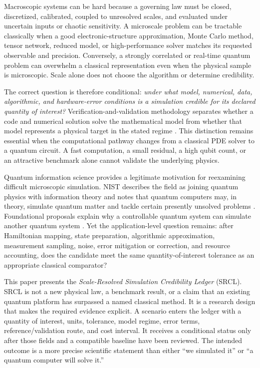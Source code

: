 \documentclass[conference]{../../../../Conference-LaTeX-template_10-17-19/IEEEtran}
\begin{document}
Macroscopic systems can be hard because a governing law must be closed, discretized, calibrated, coupled to unresolved scales, and evaluated under uncertain inputs or chaotic sensitivity. A microscale problem can be tractable classically when a good electronic-structure approximation, Monte Carlo method, tensor network, reduced model, or high-performance solver matches its requested observable and precision. Conversely, a strongly correlated or real-time quantum problem can overwhelm a classical representation even when the physical sample is microscopic. Scale alone does not choose the algorithm or determine credibility.

The correct question is therefore conditional: \emph{under what model, numerical, data, algorithmic, and hardware-error conditions is a simulation credible for its declared quantity of interest?} Verification-and-validation methodology separates whether a code and numerical solution solve the mathematical model from whether that model represents a physical target in the stated regime \cite{oberkampf_trucano2002,oberkampf_trucano2007}. This distinction remains essential when the computational pathway changes from a classical PDE solver to a quantum circuit. A fast computation, a small residual, a high qubit count, or an attractive benchmark alone cannot validate the underlying physics.

Quantum information science provides a legitimate motivation for reexamining difficult microscopic simulation. NIST describes the field as joining quantum physics with information theory and notes that quantum computers may, in theory, simulate quantum matter and tackle certain presently unsolved problems \cite{nist_qis_page}. Foundational proposals explain why a controllable quantum system can simulate another quantum system \cite{feynman1982,lloyd1996}. Yet the application-level question remains: after Hamiltonian mapping, state preparation, algorithmic approximation, measurement sampling, noise, error mitigation or correction, and resource accounting, does the candidate meet the same quantity-of-interest tolerance as an appropriate classical comparator?

This paper presents the \emph{Scale-Resolved Simulation Credibility Ledger} (SRCL). SRCL is not a new physical law, a benchmark result, or a claim that an existing quantum platform has surpassed a named classical method. It is a research design that makes the required evidence explicit. A scenario enters the ledger with a quantity of interest, units, tolerance, model regime, error terms, reference/validation route, and cost interval. It receives a conditional status only after those fields and a compatible baseline have been reviewed. The intended outcome is a more precise scientific statement than either ``we simulated it'' or ``a quantum computer will solve it.''
\end{document}
